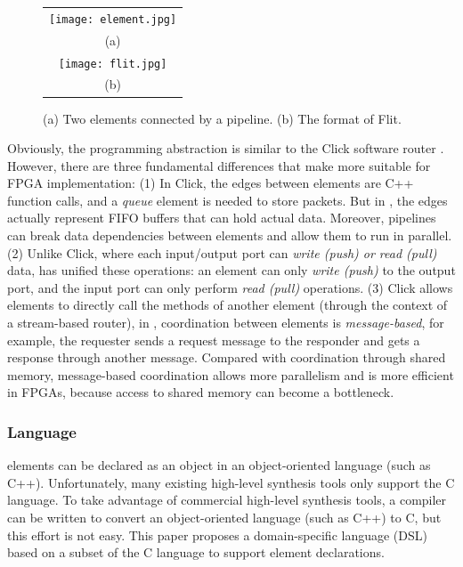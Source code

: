\begin{figure}[htbp]
	\centering
	\begin{tabular}{c}
		\texttt{[image: element.jpg]}  \\
		(a)\\
		\texttt{[image: flit.jpg]} \\
		(b) \\
	\end{tabular}
	\caption{(a) Two \name elements connected by a pipeline. (b) The format of Flit.}
	\label{clicknp:fig:element}
\end{figure}

Obviously, the \name programming abstraction is similar to the Click software router \cite {kohler2000click}.
However, there are three fundamental differences that make \name more suitable for FPGA implementation:
(1) In Click, the edges between elements are C++ function calls, and a \textit {queue} element is needed to store packets.
But in \name, the edges actually represent FIFO buffers that can hold actual data. Moreover, \name pipelines can break data dependencies between elements and allow them to run in parallel.
(2) Unlike Click, where each input/output port can \textit {write (push) or read (pull)} data, \name has unified these operations: an element can only \textit {write (push)} to the output port, and the input port can only perform \textit {read (pull)} operations.
(3) Click allows elements to directly call the methods of another element (through the context of a stream-based router), in \name, coordination between elements is \textit {message-based}, for example, the requester sends a request message to the responder and gets a response through another message.
Compared with coordination through shared memory, message-based coordination allows more parallelism and is more efficient in FPGAs, because access to shared memory can become a bottleneck.

\subsubsection{Language}

\name elements can be declared as an object in an object-oriented language (such as C++).
Unfortunately, many existing high-level synthesis tools only support the C language.
To take advantage of commercial high-level synthesis tools, a compiler can be written to convert an object-oriented language (such as C++) to C, but this effort is not easy.
This paper proposes a domain-specific language (DSL) based on a subset of the C language to support element declarations.

